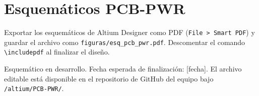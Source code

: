 \chapter{Esquemáticos PCB-PWR}
\label{chap:anexo_esq_pwr}

\begin{infobox}
  Exportar los esquemáticos de Altium Designer como PDF
  (\texttt{File > Smart PDF}) y guardar el archivo como
  \texttt{figuras/esq\_pcb\_pwr.pdf}.
  Descomentar el comando \texttt{\textbackslash includepdf} al finalizar
  el diseño.
\end{infobox}

% 

\begin{riskbox}
  Esquemático en desarrollo. Fecha esperada de finalización: [fecha].
  El archivo editable está disponible en el repositorio de GitHub del equipo
  bajo \texttt{/altium/PCB-PWR/}.
\end{riskbox}

